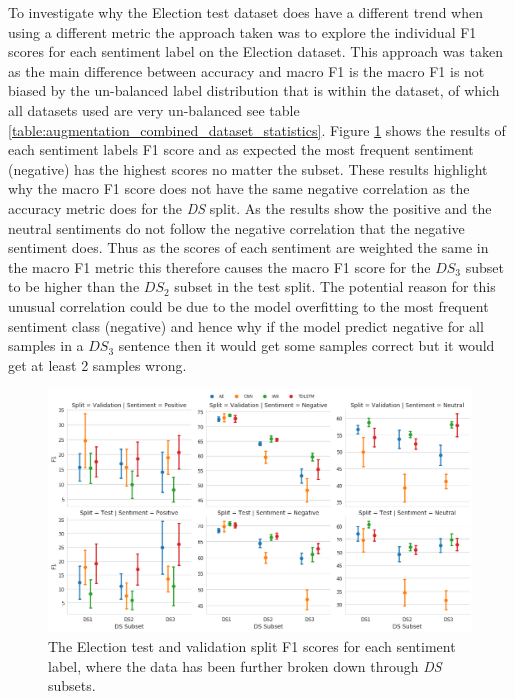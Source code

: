 To investigate why the Election test dataset does have a different trend when using a different metric the approach taken was to explore the individual F1 scores for each sentiment label on the Election dataset. This approach was taken as the main difference between accuracy and macro F1 is the macro F1 is not biased by the un-balanced label distribution that is within the dataset, of which all datasets used are very un-balanced see table \ref{table:augmentation_combined_dataset_statistics}. Figure \ref{fig:aug_baseline_sentiment_f1_ds_election} shows the results of each sentiment labels F1 score and as expected the most frequent sentiment (negative) has the highest scores no matter the subset. These results highlight why the macro F1 score does not have the same negative correlation as the accuracy metric does for the \textit{DS} split. As the results show the positive and the neutral sentiments do not follow the negative correlation that the negative sentiment does. Thus as the scores of each sentiment are weighted the same in the macro F1 metric this therefore causes the macro F1 score for the $DS_3$ subset to be higher than the $DS_2$ subset in the test split. The potential reason for this unusual correlation could be due to the model overfitting to the most frequent sentiment class (negative) and hence why if the model predict negative for all samples in a $DS_3$ sentence then it would get some samples correct but it would get at least 2 samples wrong.

\begin{figure}[h!]
    \centering
    \includegraphics[scale=0.3]{images/augmentation/methods_performance/baseline/sentiment_f1_ds_election.png}
    \caption{The Election test and validation split F1 scores for each sentiment label, where the data has been further broken down through \textit{DS} subsets.}
    \label{fig:aug_baseline_sentiment_f1_ds_election}
\end{figure}

